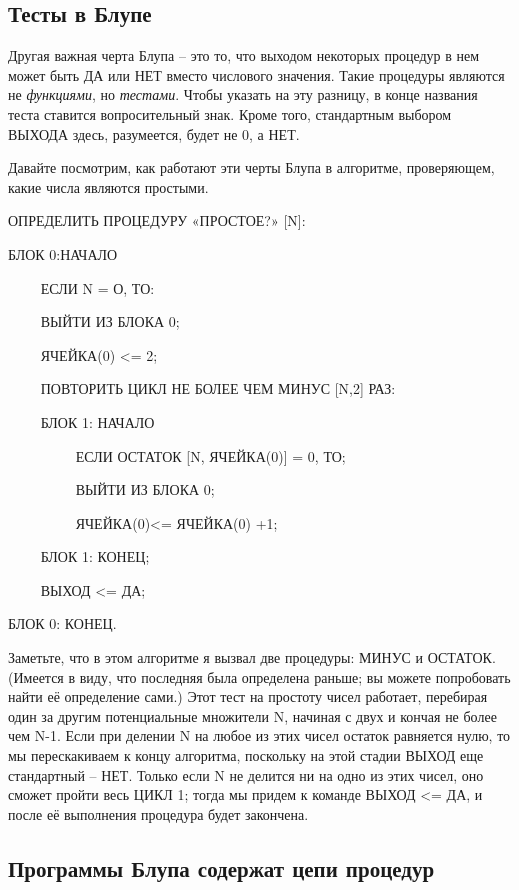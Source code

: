 \documentclass[../main.tex]{subfiles}
\begin{document}
\subsection{Тесты в Блупе}

Другая важная черта Блупа \--- это то, что выходом некоторых процедур в нем может быть ДА или НЕТ вместо числового значения. Такие процедуры являются не \emph{функциями}, но \emph{тестами}. Чтобы указать на эту разницу, в конце названия теста ставится вопросительный знак. Кроме того, стандартным выбором ВЫХОДА здесь, разумеется, будет не 0, а НЕТ.

Давайте посмотрим, как работают эти черты Блупа в алгоритме, проверяющем, какие числа являются простыми.

ОПРЕДЕЛИТЬ ПРОЦЕДУРУ «ПРОСТОЕ?» {[}N{]}:

БЛОК 0:НАЧАЛО

~~~~ ЕСЛИ N = О, ТО:

~~~~ ВЫЙТИ ИЗ БЛОКА 0;

~~~~ ЯЧЕЙКА(0) \textless= 2;

~~~~ ПОВТОРИТЬ ЦИКЛ НЕ БОЛЕЕ ЧЕМ МИНУС {[}N,2{]} РАЗ:

~~~~ БЛОК 1: НАЧАЛО

~~~~~~~~~ ЕСЛИ ОСТАТОК {[}N, ЯЧЕЙКА(0){]} = 0, ТО;

~~~~~~~~~ ВЫЙТИ ИЗ БЛОКА 0;

~~~~~~~~~ ЯЧЕЙКА(0)\textless= ЯЧЕЙКА(0) +1;

~~~~ БЛОК 1: КОНЕЦ;

~~~~ ВЫХОД \textless= ДА;

БЛОК 0: КОНЕЦ.

Заметьте, что в этом алгоритме я вызвал две процедуры: МИНУС и ОСТАТОК\@. (Имеется в виду, что последняя была определена раньше; вы можете попробовать найти её определение сами.) Этот тест на простоту чисел работает, перебирая один за другим потенциальные множители N, начиная с двух и кончая не более чем N-1. Если при делении N на любое из этих чисел остаток равняется нулю, то мы перескакиваем к концу алгоритма, поскольку на этой стадии ВЫХОД еще стандартный \--- НЕТ\@. Только если N не делится ни на одно из этих чисел, оно сможет пройти весь ЦИКЛ 1; тогда мы придем к команде ВЫХОД \textless= ДА, и после её выполнения процедура будет закончена.


\subsection{Программы Блупа содержат цепи процедур}
\end{document}
